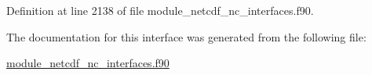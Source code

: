 Definition at line 2138 of file module\+\_\+netcdf\+\_\+nc\+\_\+interfaces.\+f90.



The documentation for this interface was generated from the following file\+:\begin{DoxyCompactItemize}
\item 
\hyperlink{module__netcdf__nc__interfaces_8f90}{module\+\_\+netcdf\+\_\+nc\+\_\+interfaces.\+f90}\end{DoxyCompactItemize}
